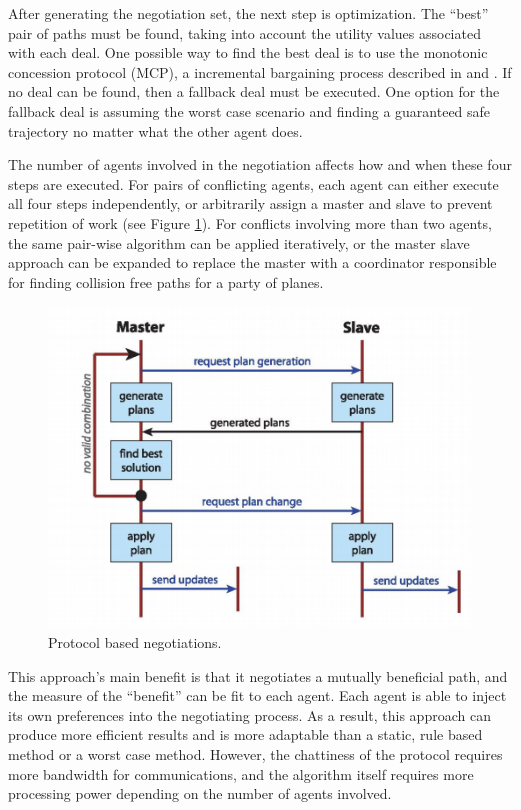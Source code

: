 \documentclass[conference]{IEEEtran}
\begin{document}
After generating the negotiation set, the next step is optimization. The “best” pair of paths must be found, taking into account the utility values associated with each deal. One possible way to find the best deal is to use the monotonic concession protocol (MCP), a incremental bargaining process described in  \cite{wollkind2004automated}  and \cite{zlotkin1989negotiation}. If no deal can be found, then a fallback deal must be executed. One option for the fallback deal is assuming the worst case scenario and finding a guaranteed safe trajectory no matter what the other agent does. 

The number of agents involved in the negotiation affects how and when these four steps are executed. For pairs of conflicting agents, each agent can either execute all four steps independently, or arbitrarily assign a master and slave to prevent repetition of work (see Figure \ref{fig:07SislakMaster}). For conflicts involving more than two agents, the same pair-wise algorithm can be applied iteratively, or the master slave approach can be expanded to replace the master with a coordinator responsible for finding collision free paths for a party of planes.

\begin{figure}[h]
	\includegraphics [width=1\columnwidth] {07SislakMasterSlave}
	\caption{Protocol based negotiations. \cite{vsivslak2008agentfly}}
	\label{fig:07SislakMaster}
\end{figure}


This approach’s main benefit is that it negotiates a mutually beneficial path, and the measure of the “benefit” can be fit to each agent. Each agent is able to inject its own preferences into the negotiating process. As a result, this approach can produce more efficient results and is more adaptable than a static, rule based method or a worst case method. However, the chattiness of the protocol requires more bandwidth for communications, and the algorithm itself requires more processing power depending on the number of agents involved. 
\end{document}
